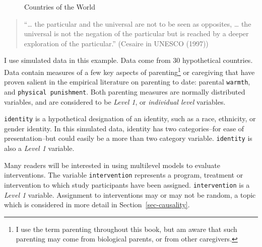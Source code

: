 \documentclass[
  letterpaper,
  DIV=11,
  numbers=noendperiod]{scrreprt}
\begin{document}
\begin{figure}


\caption{\label{fig-world}Countries of the World}

\end{figure}%

\begin{quote}
``\ldots{} the particular and the universal are not to be seen as
opposites, \ldots{} the universal is not the negation of the particular
but is reached by a deeper exploration of the particular.'' (Cesaire in
UNESCO (1997)) 
\end{quote}

I use simulated data in this example. Data come from 30 hypothetical
countries. Data contain measures of a few key aspects of
parenting\footnote{I use the term parenting throughout this book, but am
  aware that such parenting may come from biological parents, or from
  other caregivers.} or caregiving that have proven salient in the
empirical literature on parenting to date: parental \texttt{warmth}, and
\texttt{physical\ punishment}. Both parenting measures are normally
distributed variables, and are considered to be \emph{Level 1}, or
\emph{individual level} variables.

\texttt{identity} is a hypothetical designation of an identity, such as
a race, ethnicity, or gender identity. In this simulated data, identity
has two categories--for ease of presentation--but could easily be a more
than two category variable. \texttt{identity} is also a \emph{Level 1}
variable.

Many readers will be interested in using multilevel models to evaluate
interventions. The variable \texttt{intervention} represents a program,
treatment or intervention to which study participants have been
assigned. \texttt{intervention} is a \emph{Level 1} variable. Assignment
to interventions may or may not be random, a topic which is considered
in more detail in Section~\ref{sec-causality}.
\end{document}
